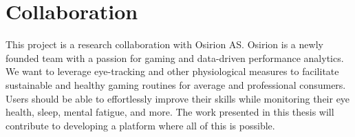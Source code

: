 \section{Collaboration}

This project is a research collaboration with Osirion AS. Osirion is a newly founded team with a passion for gaming and data-driven performance analytics. We want to leverage eye-tracking and other physiological measures to facilitate sustainable and healthy gaming routines for average and professional consumers. Users should be able to effortlessly improve their skills while monitoring their eye health, sleep, mental fatigue, and more. The work presented in this thesis will contribute to developing a platform where all of this is possible. 